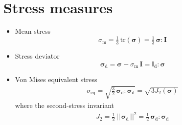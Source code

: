 \documentclass[namecite, fleqn]{goose-article}
\begin{document}
\section{Stress measures}
\label{sec:ap:stress}

\begin{itemize}

    \item Mean stress
    \begin{equation}
        \sigma_\mathrm{m}
        = \tfrac{1}{3} \, \mathrm{tr} ( \bm{\sigma} )
        = \tfrac{1}{3} \, \bm{\sigma} : \bm{I}
    \end{equation}

    \item Stress deviator
    \begin{equation}
        \bm{\sigma}_\mathrm{d}
        = \bm{\sigma} - \sigma_\mathrm{m} \, \bm{I}
        = \mathbb{I}_\mathrm{d} : \bm{\sigma}
    \end{equation}

    \item Von Mises equivalent stress
    \begin{align}
        \sigma_\mathrm{eq}
        = \sqrt{ \tfrac{3}{2} \, \bm{\sigma}_\mathrm{d} : \bm{\sigma}_\mathrm{d} }
        = \sqrt{ 3 J_2(\bm{\sigma}) }
    \end{align}
    where the second-stress invariant
    \begin{align}
        J_2 = \tfrac{1}{2} \, || \, \bm{\sigma}_\mathrm{d} \, ||^2
        = \tfrac{1}{2} \, \bm{\sigma}_\mathrm{d} : \bm{\sigma}_\mathrm{d}
    \end{align}

\end{itemize}

\scriptsize

\end{document}
